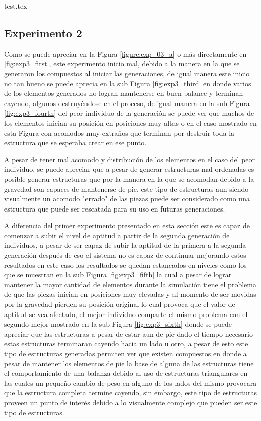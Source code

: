 {test.tex} 

\newpage

\subsection{Experimento 2}
\label{chap6:exp_2}

Como se puede apreciar en la Figura \ref{figure:exp_03_a} o más directamente en
\ref{fig:exp3_first}, este experimento inicio mal, debido a la manera en la que se
generaron los compuestos al iniciar las generaciones, de igual manera este inicio
no tan bueno se puede aprecia en la sub Figura \ref{fig:exp3_third} en donde
varios de los elementos generados no logran mantenerse en buen balance y terminan
cayendo, algunos destruyéndose en el proceso, de igual manera en la sub Figura
\ref{fig:exp3_fourth} del peor individuo de la generación se puede ver que
muchos de los elementos inician su posición en posiciones muy altas o en el caso
mostrado en esta Figura con acomodos muy extraños que terminan por destruir toda
la estructura que se esperaba crear en ese punto.

A pesar de tener mal acomodo y distribución de los elementos en el caso del peor
individuo, se puede apreciar que a pesar de generar estructuras mal ordenadas es
posible generar estructuras que por la manera en la que se acomodan debido a la
gravedad son capaces de mantenerse de pie, este tipo de estructuras aun siendo
visualmente un acomodo "errado" de las piezas puede ser considerado como una
estructura que puede ser rescatada para su uso en futuras generaciones.

A diferencia del primer experimento presentado en esta sección este es capaz de
comenzar a subir el nivel de aptitud a partir de la segunda generación de
individuos, a pesar de ser capaz de subir la aptitud de la primera a la segunda
generación después de eso el sistema no es capaz de continuar mejorando estos
resultados en este caso los resultados se quedan estancados en niveles como los
que se muestran en la sub Figura \ref{fig:exp3_fifth} la cual a pesar de lograr
mantener la mayor cantidad de elementos durante la simulación tiene el problema
de que las piezas inician en posiciones muy elevadas y al momento de ser movidas
por la gravedad pierden su posición original lo cual provoca que el valor de
aptitud se vea afectado, el mejor individuo comparte el mismo problema con el
segundo mejor mostrado en la sub Figura \ref{fig:exp3_sixth} donde se puede
apreciar que las estructuras a pesar de estar aun de pie dado el tiempo
necesario estas estructuras terminaran cayendo hacia un lado u otro, a pesar de
esto este tipo de estructuras generadas permiten ver que existen compuestos en
donde a pesar de mantener los elementos de pie la base de alguna de las
estructuras tiene el comportamiento de una balanza debido al uso de estructuras
triangulares en las cuales un pequeño cambio de peso en alguno de los lados del
mismo provocara que la estructura completa termine cayendo, sin embargo, este
tipo de estructuras proveen un punto de interés debido a lo visualmente
complejo que pueden ser este tipo de estructuras.

